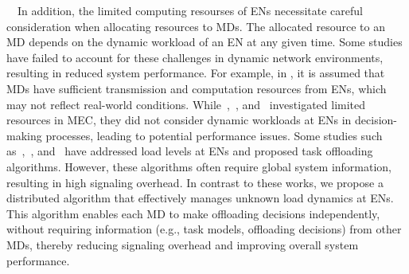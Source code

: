 \documentclass[12pt,draftclsnofoot,onecolumn]{IEEEtran}
\newenvironment{my}[2]%
{\begin{list}{}%
{\setlength{\rightmargin}{#1}\setlength{\leftmargin}{#2}}%


 \item[]{}

} {\end{list}}
\begin{document}
\begin{enumerate}
\begin{my}{1cm}{1cm}
{		
		
		
		
		
		
		\,\,\,\,
		In addition, the limited computing resourses of ENs necessitate careful consideration when allocating resources to MDs. The allocated resource to an MD depends on the dynamic workload of an EN at any given time. Some studies have failed to account for these challenges in dynamic network environments, resulting in reduced system performance. For example, in \cite{chen2021drl}, it is assumed that MDs have sufficient transmission and computation resources from ENs, which may not reflect real-world conditions. While~\cite{dai2020edge},~\cite{wu2024privacy}, and~\cite{zhao2019deep} investigated limited resources in MEC, they did not consider dynamic workloads at ENs in decision-making processes, leading to potential performance issues.
		Some studies such as~\cite{sun2024hierarchical},~\cite{gong2022edge}, and~\cite{gao2022large} have addressed load levels at ENs and proposed task offloading algorithms. However, these algorithms often require global system information, resulting in high signaling overhead. In contrast to these works, we propose a distributed algorithm that effectively manages unknown load dynamics at ENs. This algorithm enables each MD to make offloading decisions independently, without requiring information (e.g., task models, offloading decisions) from other MDs, thereby reducing signaling overhead and improving overall system performance.\vspace{2mm}
		
		
		
		
		 }
	\end{my}
		
	
	
	
	
	
	






%
%
%







\end{enumerate}
\end{document}
